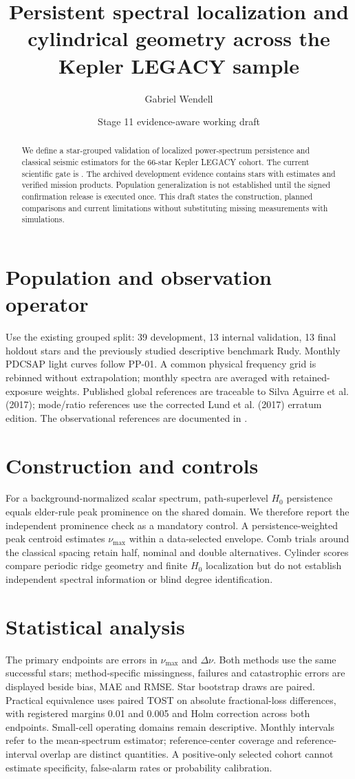 \documentclass[11pt]{article}
\title{Persistent spectral localization and cylindrical geometry across the Kepler LEGACY sample}
\author{Gabriel Wendell}
\date{Stage 11 evidence-aware working draft}
\begin{document}
\maketitle
\begin{abstract}
We define a star-grouped validation of localized power-spectrum persistence and
classical seismic estimators for the 66-star Kepler LEGACY cohort. The current
scientific gate is \GateStatus. The archived development evidence contains
\ObservedStars{} stars with estimates and \PayloadCount{} verified mission products.
Population generalization is not established until the signed confirmation release
is executed once. This draft states the construction, planned comparisons and
current limitations without substituting missing measurements with simulations.
\end{abstract}
\section{Population and observation operator}
Use the existing grouped split: 39 development, 13 internal validation, 13 final
holdout stars and the previously studied descriptive benchmark Rudy. Monthly
PDCSAP light curves follow PP-01. A common physical frequency grid is rebinned
without extrapolation; monthly spectra are averaged with retained-exposure weights.
Published global references are traceable to Silva Aguirre et al. (2017);
mode/ratio references use the corrected Lund et al. (2017) erratum edition.
The observational references are documented in
\cite{SilvaAguirre2017,Lund2017,Lund2017Erratum}.
\section{Construction and controls}
For a background-normalized scalar spectrum, path-superlevel $H_0$ persistence
equals elder-rule peak prominence on the shared domain. We therefore report the
independent prominence check as a mandatory control. A persistence-weighted peak
centroid estimates $\nu_{\max}$ within a data-selected envelope. Comb trials around
the classical spacing retain half, nominal and double alternatives. Cylinder
scores compare periodic ridge geometry and finite $H_0$ localization but do not
establish independent spectral information or blind degree identification.
\section{Statistical analysis}
The primary endpoints are errors in $\nu_{\max}$ and $\Delta\nu$. Both methods use
the same successful stars; method-specific missingness, failures and catastrophic
errors are displayed beside bias, MAE and RMSE. Star bootstrap draws are paired.
Practical equivalence uses paired TOST on absolute fractional-loss differences,
with registered margins 0.01 and 0.005 and Holm correction across both endpoints.
Small-cell operating domains remain descriptive. Monthly intervals refer to the
mean-spectrum estimator; reference-center coverage and reference-interval overlap
are distinct quantities. A positive-only selected cohort cannot estimate
specificity, false-alarm rates or probability calibration.
\end{document}
